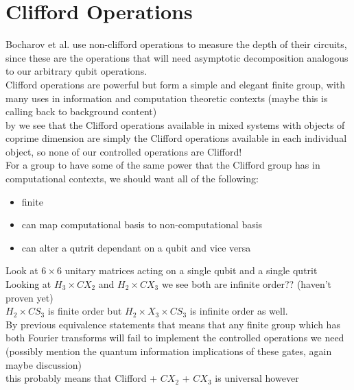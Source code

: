 \section{Clifford Operations}
Bocharov et al. use non-clifford operations to measure the depth of their circuits, since these are the operations that will need asymptotic decomposition analogous to our arbitrary qubit operations.
\\Clifford operations are powerful but form a simple and elegant finite group, with many uses in information and computation theoretic contexts (maybe this is calling back to background content)
\\by \cite{tolar-clifford} we see that the Clifford operations available in mixed systems with objects of coprime dimension are simply the Clifford operations available in each individual object, so none of our controlled operations are Clifford!
\\For a group to have some of the same power that the Clifford group has in computational contexts, we should want all of the following:
\begin{itemize}
	\item finite
	\item can map computational basis to non-computational basis
	\item can alter a qutrit dependant on a qubit and vice versa
\end{itemize}
Look at $6\times 6$ unitary matrices acting on a single qubit and a single qutrit
\\Looking at $H_3 \times CX_2$ and $H_2 \times CX_3$ we see both are infinite order?? (haven't proven yet)
\\$H_2 \times CS_3$ is finite order but $H_2 \times X_3 \times CS_3$ is infinite order as well.
\\By previous equivalence statements that means that any finite group which has both Fourier transforms will fail to implement the controlled operations we need
\\(possibly mention the quantum information implications of these gates, again maybe discussion)
\\this probably means that Clifford + $CX_2$ + $CX_3$ is universal however
